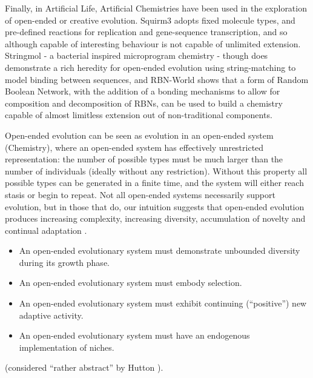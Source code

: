 Finally, in Artificial Life, Artificial Chemistries have been used in the exploration of open-ended or creative evolution. Squirm3 \parencite{Hutton2002,Hutton2009,Lucht2012} adopts fixed molecule types, and pre-defined reactions for replication and gene-sequence transcription, and so although capable of interesting behaviour is not capable of unlimited extension. Stringmol \parencite{Hickinbotham2011} - a bacterial inspired microprogram chemistry - though does demonstrate a rich heredity for open-ended evolution using string-matching to model binding between sequences, and RBN-World \parencite{Faulconbridge2011} shows that a form of Random Boolean Network, with the addition of a bonding mechanisms to allow for composition and decomposition of RBNs, can be used to build a chemistry capable of almost limitless extension out of non-traditional components.

Open-ended evolution can be seen as evolution in an open-ended system (\eg Chemistry), where an open-ended system has effectively unrestricted representation: the number of possible types must be much larger than the number of individuals (ideally without any restriction). Without this property all possible types can be generated in a finite time, and the system will either reach stasis or begin to repeat. Not all open-ended systems necessarily support evolution, but in those that do, our intuition suggests that open-ended evolution produces increasing complexity, increasing diversity, accumulation of novelty and continual adaptation \cite{Lehman2012}.


\begin{itemize}
	\item An open-ended evolutionary system must demonstrate unbounded diversity during its growth phase.
	\item An open-ended evolutionary system must embody selection.
	\item An open-ended evolutionary system must exhibit continuing (``positive'') new adaptive activity.
	\item An open-ended evolutionary system must have an endogenous implementation of niches.
\end{itemize} \cite{Maley1999} (considered ``rather abstract'' by Hutton \parencite[p.341]{Hutton2002}).

